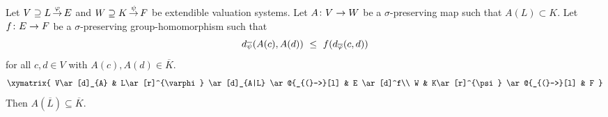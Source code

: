 \documentclass[main.tex]{subfiles}
\begin{document}
%
%
\begin{thm}
\label{T:ext2}
Let $V \supseteq L\,\smash{\stackrel{\varphi}{\rightarrow}}\,E$ and
 $W \supseteq K\,\smash{\stackrel{\psi}{\rightarrow}}\,F$ be extendible valuation systems.
Let
$A\colon V\rightarrow W$
be a $\sigma$-preserving map
such that $A(L)\subset K$.
Let $f\colon E\rightarrow F$ be a $\sigma$-preserving group-homomorphism
such that
\begin{equation}
\label{eq:T:ext2-as}
\ld{\overline{\psi}}(A(c),A(d))\ \leq\  f(\ld{\overline{\varphi}}(c,d))
\end{equation}
for all $c,d\in V$ with $A(c),A(d)\in \overline K$.
\begin{equation*}
\xymatrix{
V\ar[d]_{A} & 
  L\ar[r]^{\varphi} \ar[d]_{A|L} \ar@{_{(}->}[l] & 
  E \ar[d]^f\\
W &
  K\ar[r]^{\psi} \ar@{_{(}->}[l] & 
  F
}\end{equation*}
Then $A(\overline{L})\subseteq \overline{K}$.
\end{thm}
\end{document}

